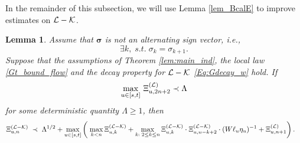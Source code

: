 \documentclass[10pt,reqno]{article}
\theoremstyle{plain} %
\newtheorem{lemma}[theorem]{Lemma}
\theoremstyle{remark}
\numberwithin{equation}{section}
\begin{document}
In the remainder of this subsection, we will use %
Lemma \ref{lem_BcalE} to  improve estimates on $\cal L-\cal K$.  

\begin{lemma}\label{lem:STOeq_NQ} 
Assume that $\boldsymbol{\sigma}$ is not an alternating sign vector, i.e., 
\begin{equation}\label{NALsigm}
    \exists k,\; s.t.\; \sigma_k=\sigma_{k+1}.
\end{equation} 
Suppose that the   assumptions of  Theorem \ref{lem:main_ind},  the local law \eqref{Gt_bound_flow} and the decay property for $\cal L-\cal K$ \eqref{Eq:Gdecay_w} hold. If 
 $$
 \max_{u\in [s,t]}\, \Xi^{(\cal L)}_{u, {2n+2}}\prec {  \Lambda}
 $$
 for some deterministic quantity $ \Lambda \ge 1$, 
then 
\begin{align}\label{am;asoiuw}
 \Xi^{({\cal L-\cal K})}_{u,n}
 \;\prec\;  &\; { \Lambda}^{1/2}+\max_{u\in [s,t]}
  \left(\; \max_{k<n }\Xi^{({\cal L-\cal K})}_{u,k}+\max_{k:\;2\le k\le n }\Xi^{({\cal L-\cal K})}_{u,k}\cdot \Xi^{({\cal L-\cal K})}_{u,n-k+2}\cdot(W\ell_u\eta_u)^{-1}+\Xi^{({\cal L})}_{u,n+1}\right).
\end{align}
 
 
\end{lemma}
\end{document}

